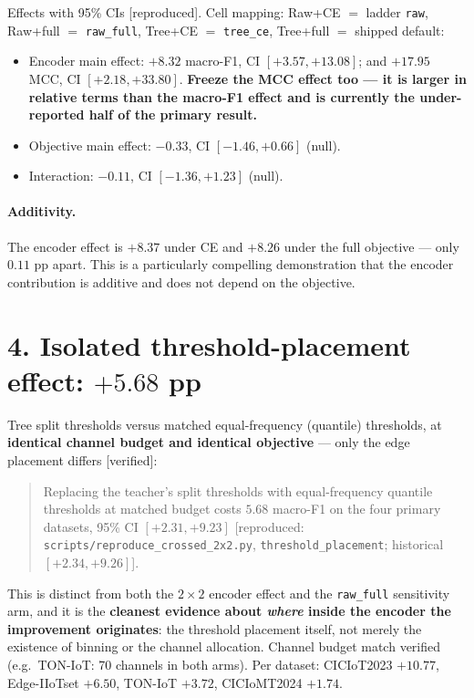 \noindent Effects with 95\% CIs \textup{[reproduced]}. Cell mapping: Raw+CE $=$ ladder \texttt{raw}, Raw+full $=$ \texttt{raw\_full}, Tree+CE $=$ \texttt{tree\_ce}, Tree+full $=$ shipped default:
\begin{itemize}
  \item Encoder main effect: $\mathbf{+8.32}$ macro-F1, CI $[+3.57, +13.08]$; and
        $\mathbf{+17.95}$ MCC, CI $[+2.18, +33.80]$. \textbf{Freeze the MCC effect too ---
        it is larger in relative terms than the macro-F1 effect and is currently the
        under-reported half of the primary result.}
  \item Objective main effect: $-0.33$, CI $[-1.46, +0.66]$ (null).
  \item Interaction: $-0.11$, CI $[-1.36, +1.23]$ (null).
\end{itemize}

\paragraph{Additivity.} The encoder effect is $+8.37$ under CE and $+8.26$ under the full
objective --- only $\mathbf{0.11}$ pp apart. This is a particularly compelling
demonstration that the encoder contribution is additive and does not depend on the
objective.

\section*{4. Isolated threshold-placement effect: $+5.68$ pp}

Tree split thresholds versus matched equal-frequency (quantile) thresholds, at
\textbf{identical channel budget and identical objective} --- only the edge placement
differs \textup{[verified]}:

\begin{quote}
Replacing the teacher's split thresholds with equal-frequency quantile thresholds at
matched budget costs $\mathbf{5.68}$ macro-F1 on the four primary datasets, 95\% CI
$[+2.31, +9.23]$ \textup{[reproduced: \texttt{scripts/reproduce\_crossed\_2x2.py},
\texttt{threshold\_placement}; historical $[+2.34,+9.26]$]}.
\end{quote}

\noindent This is distinct from both the $2\times2$ encoder effect and the
\texttt{raw\_full} sensitivity arm, and it is the \textbf{cleanest evidence about
\emph{where} inside the encoder the improvement originates}: the threshold placement
itself, not merely the existence of binning or the channel allocation. Channel budget
match verified (e.g.\ TON-IoT: 70 channels in both arms). Per dataset: CICIoT2023
$+10.77$, Edge-IIoTset $+6.50$, TON-IoT $+3.72$, CICIoMT2024 $+1.74$.

